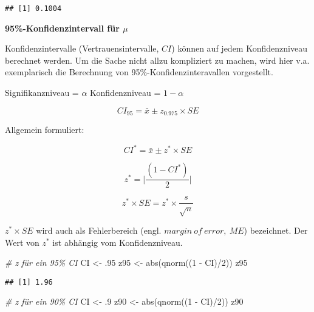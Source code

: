 \documentclass[
]{book}
\newenvironment{Shaded}{\begin{snugshade}}{\end{snugshade}}
\newcommand{\CommentTok}[1]{\textcolor[rgb]{0.56,0.35,0.01}{\textit{#1}}}
\newcommand{\DecValTok}[1]{\textcolor[rgb]{0.00,0.00,0.81}{#1}}
\newcommand{\FunctionTok}[1]{\textcolor[rgb]{0.00,0.00,0.00}{#1}}
\newcommand{\NormalTok}[1]{#1}
\newcommand{\OtherTok}[1]{\textcolor[rgb]{0.56,0.35,0.01}{#1}}
\newcommand{\SpecialCharTok}[1]{\textcolor[rgb]{0.00,0.00,0.00}{#1}}
\begin{document}
\begin{verbatim}
## [1] 0.1004
\end{verbatim}

\textbf{95\%-Konfidenzintervall für \(\mu\)}

Konfidenzintervalle (Vertrauensintervalle, \(CI\)) können auf jedem Konfidenzniveau berechnet werden. Um die Sache nicht allzu kompliziert zu machen, wird hier v.a. exemplarisch die Berechnung von 95\%-Konfidenzinteravallen vorgestellt.

Signifikanzniveau = \(\alpha\)
Konfidenzniveau = \(1-\alpha\)

\begin{equation}
  CI_{95} = \bar{x} \pm z_{0.975} \times SE
  \label{eq:cinorm}
\end{equation}

Allgemein formuliert:

\begin{equation}
  CI^* = \bar{x} \pm z^* \times SE
  \label{eq:cinorm}
\end{equation}

\begin{equation}
  z^* = \vert \frac{(1-CI^*)}{2} \vert
  \label{eq:zforci}
\end{equation}

\begin{equation}
  z^* \times SE = z^* \times \frac{s}{\sqrt{n}}
  \label{eq:ME}
\end{equation}

\(z^* \times SE\) wird auch als Fehlerbereich (engl. \(margin~ of~ error,~ ME\)) bezeichnet.
Der Wert von \(z^*\) ist abhängig vom Konfidenzniveau.

\begin{Shaded}
\begin{Highlighting}[]
\CommentTok{\# z für ein 95\% CI}
\NormalTok{CI }\OtherTok{\textless{}{-}}\NormalTok{ .}\DecValTok{95}
\NormalTok{z95 }\OtherTok{\textless{}{-}} \FunctionTok{abs}\NormalTok{(}\FunctionTok{qnorm}\NormalTok{((}\DecValTok{1} \SpecialCharTok{{-}}\NormalTok{ CI)}\SpecialCharTok{/}\DecValTok{2}\NormalTok{))}
\NormalTok{z95}
\end{Highlighting}
\end{Shaded}

\begin{verbatim}
## [1] 1.96
\end{verbatim}

\begin{Shaded}
\begin{Highlighting}[]
\CommentTok{\# z für ein 90\% CI}
\NormalTok{CI }\OtherTok{\textless{}{-}}\NormalTok{ .}\DecValTok{9}
\NormalTok{z90 }\OtherTok{\textless{}{-}} \FunctionTok{abs}\NormalTok{(}\FunctionTok{qnorm}\NormalTok{((}\DecValTok{1} \SpecialCharTok{{-}}\NormalTok{ CI)}\SpecialCharTok{/}\DecValTok{2}\NormalTok{))}
\NormalTok{z90}
\end{Highlighting}
\end{Shaded}
\end{document}
